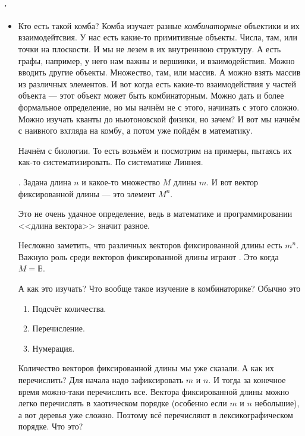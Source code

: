 \documentclass{article}
\begin{document}
    \paragraph{.}
    \begin{itemize}
        \item[]
        \begin{Comment}
           Кто есть такой комба? Комба изучает разные \textit{комбинаторные} объектики и их взаимодейтсвия. У нас есть какие-то примитивные объекты. Числа, там, или точки на плоскости. И мы не лезем в их внутреннюю структуру. А есть графы, например, у него нам важны и вершинки, и взаимодействия. Можно вводить другие объекты. Множество, там, или массив. А можно взять массив из различных элементов. И вот когда есть какие-то взаимодействия у частей объекта --- этот объект может быть комбинаторным. Можно дать и более формальное определение, но мы начнём не с этого, начинать с этого сложно. Можно изучать кванты до ньютоновской физики, но зачем? И вот мы начнём с наивного вхгляда на комбу, а потом уже пойдём в математику.
        \end{Comment}
        \begin{Comment}
            Начнём с биологии. То есть возьмём и посмотрим на примеры, пытаясь их как-то систематизировать. По систематике Линнея.
        \end{Comment}
        \dfn {}. Задана длина $n$ и какое-то множество $M$ длины $m$. И вот вектор фиксированной длины --- это элемент $M^n$.
        \begin{Comment}
            Это не очень удачное определение, ведь в математике и программировании <<длина вектора>> значит разное.
        \end{Comment}
        \thm Несложно заметить, что различных векторов фиксированной длины есть $m^n$.
        \dfn Важную роль среди векторов фиксированной длины играют . Это когда $M=\mathbb B$.
        \begin{Comment}
            А как это изучать? Что вообще такое изучение в комбинаторике? Обычно это
            \begin{enumerate}
                \item Подсчёт количества.
                \item Перечисление.
                \item Нумерация.
            \end{enumerate}
            Количество векторов фиксированной длины мы уже сказали. А как их перечислить? Для начала надо зафиксировать $m$ и $n$. И тогда за конечное время можно-таки перечислить все. Вектора фиксированной длины можно легко перечислять в хаотическом порядке (особенно если $m$ и $n$ небольшие), а вот деревья уже сложно. Поэтому всё перечисляют в лексикографическом порядке. Что это?

\end{Comment}
\end{itemize}
\end{document}
